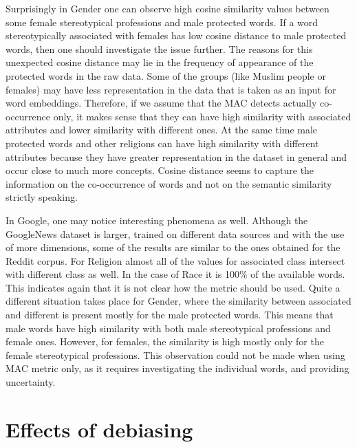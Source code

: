 \documentclass[
  10pt,
  dvipsnames,enabledeprecatedfontcommands]{scrartcl}
\begin{document}
Surprisingly in Gender one can observe high cosine similarity values
between some female stereotypical professions and male protected words.
If a word stereotypically associated with females has low cosine
distance to male protected words, then one should investigate the issue
further. The reasons for this unexpected cosine distance may lie in the
frequency of appearance of the protected words in the raw data. Some of
the groups (like Muslim people or females) may have less representation
in the data that is taken as an input for word embeddings. Therefore, if
we assume that the MAC detects actually co-occurrence only, it makes
sense that they can have high similarity with associated attributes and
lower similarity with different ones. At the same time male protected
words and other religions can have high similarity with different
attributes because they have greater representation in the dataset in
general and occur close to much more concepts. Cosine distance seems to
capture the information on the co-occurrence of words and not on the
semantic similarity strictly speaking.

In Google, one may notice interesting phenomena as well. Although the
GoogleNews dataset is larger, trained on different data sources and with
the use of more dimensions, some of the results are similar to the ones
obtained for the Reddit corpus. For Religion almost all of the values
for associated class intersect with different class as well. In the case
of Race it is 100\% of the available words. This indicates again that it
is not clear how the metric should be used. Quite a different situation
takes place for Gender, where the similarity between associated and
different is present mostly for the male protected words. This means
that male words have high similarity with both male stereotypical
professions and female ones. However, for females, the similarity is
high mostly only for the female stereotypical professions. This
observation could not be made when using MAC metric only, as it requires
investigating the individual words, and providing uncertainty.

\hypertarget{effects-of-debiasing}{%
\section{Effects of debiasing}\label{effects-of-debiasing}}
\end{document}
